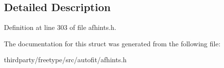 \subsection{Detailed Description}


Definition at line 303 of file afhints.\+h.



The documentation for this struct was generated from the following file\+:\begin{DoxyCompactItemize}
\item 
thirdparty/freetype/src/autofit/afhints.\+h\end{DoxyCompactItemize}
